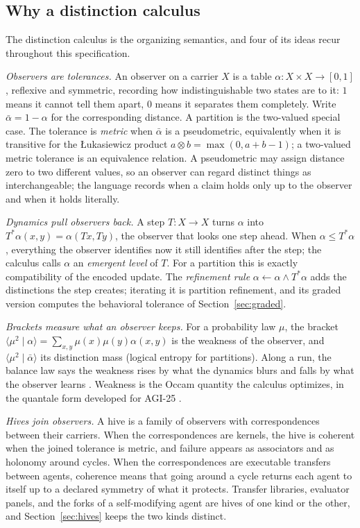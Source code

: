 \documentclass[11pt]{article}
\newcommand{\ab}{\bar\alpha}
\newcommand{\br}[2]{\langle #1 \mid #2 \rangle}
\newcommand{\Lt}{\otimes}
\theoremstyle{definition}
\theoremstyle{plain}
\begin{document}
\subsection{Why a distinction calculus}\label{sec:whydc}

The distinction calculus is the organizing semantics, and four of its ideas recur throughout
this specification.

\emph{Observers are tolerances.} An observer on a carrier $X$ is a table
$\alpha:X\times X\to[0,1]$, reflexive and symmetric, recording how indistinguishable two states
are to it: $1$ means it cannot tell them apart, $0$ means it separates them completely. Write
$\ab=1-\alpha$ for the corresponding distance. A partition is the two-valued special case. The
tolerance is \emph{metric} when $\ab$ is a pseudometric, equivalently when it is transitive for
the \L{}ukasiewicz product $a\Lt b=\max(0,a+b-1)$; a two-valued metric tolerance is an equivalence
relation. A pseudometric may assign distance zero to two different values, so an observer can
regard distinct things as interchangeable; the language records when a claim holds only up to
the observer and when it holds literally.

\emph{Dynamics pull observers back.} A step $T:X\to X$ turns $\alpha$ into
$T^*\alpha(x,y)=\alpha(Tx,Ty)$, the observer that looks one step ahead. When
$\alpha\le T^*\alpha$, everything the observer identifies now it still identifies after the step;
the calculus calls $\alpha$ an \emph{emergent level} of $T$. For a partition this is exactly
compatibility of the encoded update. The \emph{refinement rule} $\alpha\leftarrow\alpha\wedge
T^*\alpha$ adds the distinctions the step creates; iterating it is partition refinement, and its
graded version computes the behavioral tolerance of Section~\ref{sec:graded}.

\emph{Brackets measure what an observer keeps.} For a probability law $\mu$, the bracket
$\br{\mu^2}{\alpha}=\sum_{x,y}\mu(x)\mu(y)\alpha(x,y)$ is the weakness of the observer, and
$\br{\mu^2}{\ab}$ its distinction mass (logical entropy for partitions). Along a run, the
balance law says the weakness rises by what the dynamics blurs and falls by what the observer
learns \cite{dcnotes,dclosure}. Weakness is the Occam quantity the calculus optimizes, in the
quantale form developed for AGI-25 \cite{quantale}.

\emph{Hives join observers.} A hive is a family of observers with correspondences between their
carriers. When the correspondences are kernels, the hive is coherent when the joined tolerance is
metric, and failure appears as associators and as holonomy around cycles. When the
correspondences are executable transfers between agents, coherence means that going around a
cycle returns each agent to itself up to a declared symmetry of what it protects. Transfer
libraries, evaluator panels, and the forks of a self-modifying agent are hives of one kind or the
other, and Section~\ref{sec:hives} keeps the two kinds distinct.
\end{document}
